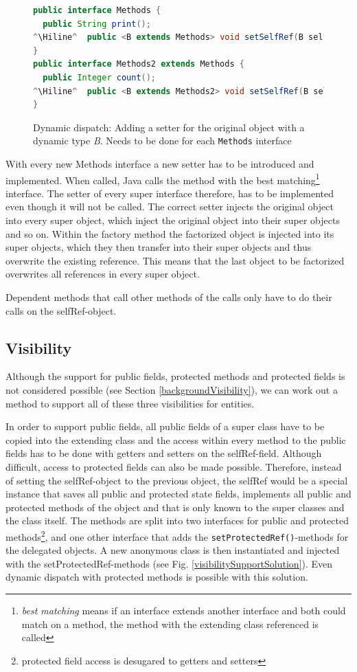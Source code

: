 \documentclass{report}
\newcommand{\Hiline}{\makebox[0pt][l]{\color[rgb]{1,0.96,0.98}\rule[-4pt]{\linewidth}{12.5pt}}}
\begin{document}
\begin{figure}[H]
\begin{lstlisting}[language=java]
public interface Methods {
  public String print();
^\Hiline^  public <B extends Methods> void setSelfRef(B selfRef);
}
public interface Methods2 extends Methods {
  public Integer count();
^\Hiline^  public <B extends Methods2> void setSelfRef(B selfRef);
}
\end{lstlisting}
\caption{Dynamic dispatch: Adding a setter for the original object with a dynamic type \emph{B}. Needs to be done for each \lstinline{Methods} interface}
\label{dynamicDispatchMethods}
\end{figure}

With every new Methods interface a new setter has to be introduced and implemented. When called, Java calls the method with the best matching\footnote{\emph{best matching} means if an interface extends another interface and both could match on a method, the method with the extending class referenced is called} interface. The setter of every super interface therefore, has to be implemented even though it will not be called. The correct setter injects the original object into every super object, which inject the original object into their super objects and so on. Within the factory method the factorized object is injected into its super objects, which they then transfer into their super objects and thus overwrite the existing reference. This means that the last object to be factorized overwrites all references in every super object.

Dependent methods that call other methods of the calls only have to do their calls on the selfRef-object.

\subsection{Visibility}
\label{extendedVisibility}
Although the support for public fields, protected methods and protected fields is not considered possible (see Section \ref{backgroundVisibility}), we can work out a method to support all of these three visibilities for entities.

In order to support public fields, all public fields of a super class have to be copied into the extending class and the access within every method to the public fields has to be done with getters and setters on the selfRef-field.
Although difficult, access to protected fields can also be made possible. Therefore, instead of setting the selfRef-object to the previous object, the selfRef would be a special instance that saves all public and protected state fields, implements all public and protected methods of the object and that is only known to the super classes and the class itself. The methods are split into two interfaces for public and protected methods\footnote{protected field access is desugared to getters and setters}, and one other interface that adds the \lstinline{setProtectedRef()}-methods for the delegated objects. A new anonymous class is then instantiated and injected with the setProtectedRef-methods (see Fig. \ref{visibilitySupportSolution}). Even dynamic dispatch with protected methods is possible with this solution.
\end{document}
